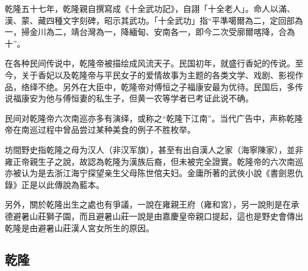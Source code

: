 乾隆五十七年，乾隆親自撰寫成《十全武功記》，自詡「十全老人」。命人以滿、漢、蒙、藏四種文字刻碑，昭示其武功。「十全武功」指“平準噶爾為二，定回部為一，掃金川為二，靖台灣為一，降緬甸、安南各一，即今二次受廓爾喀降，合為十”。

在各种民间传说中，乾隆帝被描绘成风流天子。民国初年，就盛行香妃的传说。至今，关于香妃以及乾隆帝与平民女子的爱情故事为主题的各类文学、戏剧、影视作品，络绎不绝。另外在大臣中，乾隆帝对傅恒之子福康安最为优待。民国后，多传说福康安为他与傅恒妻的私生子，但黄一农等学者已考证此说不确。

民间对乾隆帝六次南巡亦多有演绎，或称之“乾隆下江南”。当代广告中，声称乾隆帝在南巡过程中曾品尝过某种美食的例子不胜枚举。

坊間野史指乾隆之母为汉人（非汉军旗），甚至有出自漢人之家（海寧陳家），並非雍正帝親生子之說，故認為乾隆为漢族后裔，但未被完全證實。乾隆帝的六次南巡亦被认为是去浙江海宁探望亲生父母陈世倌夫妇。金庸所著的武俠小說《書劍恩仇錄》正是以此傳說為藍本。

另外，關於乾隆出生之處也有爭議，一說在雍親王府（雍和宮），另一說則是在承德避暑山莊獅子園，而且避暑山莊一說是由嘉慶皇帝親口提起，這也是野史會傳出乾隆是由避暑山莊漢人宮女所生的原因。

\subsection{乾隆}

